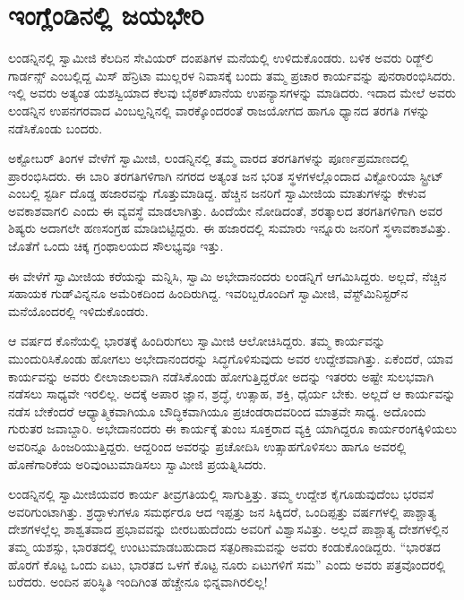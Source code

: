 
\chapter{ಇಂಗ್ಲೆಂಡಿನಲ್ಲಿ ಜಯಭೇರಿ}

\noindent

ಲಂಡನ್ನಿನಲ್ಲಿ ಸ್ವಾಮೀಜಿ ಕೆಲದಿನ ಸೇವಿಯರ್ ದಂಪತಿಗಳ ಮನೆಯಲ್ಲಿ ಉಳಿದುಕೊಂಡರು. ಬಳಿಕ ಅವರು ರಿಡ್ಜ್​ಲಿ ಗಾರ್ಡನ್ಸ್ ಎಂಬಲ್ಲಿದ್ದ ಮಿಸ್ ಹೆನ್ರಿಟಾ ಮುಲ್ಲರಳ ನಿವಾಸಕ್ಕೆ ಬಂದು ತಮ್ಮ ಪ್ರಚಾರ ಕಾರ್ಯವನ್ನು ಪುನರಾರಂಭಿಸಿದರು. ಇಲ್ಲಿ ಅವರು ಅತ್ಯಂತ ಯಶಸ್ವಿಯಾದ ಕೆಲವು ಬೈಠಕ್​ಖಾನೆಯ ಉಪನ್ಯಾಸಗಳನ್ನು ಮಾಡಿದರು. ಇದಾದ ಮೇಲೆ ಅವರು ಲಂಡನ್ನಿನ ಉಪನಗರವಾದ ವಿಂಬಲ್ಡನ್ನಿನಲ್ಲಿ ವಾರಕ್ಕೊಂದರಂತೆ ರಾಜಯೋಗದ ಹಾಗೂ ಧ್ಯಾನದ ತರಗತಿ ಗಳನ್ನು ನಡೆಸಿಕೊಂಡು ಬಂದರು.

ಅಕ್ಟೋಬರ್ ತಿಂಗಳ ವೇಳೆಗೆ ಸ್ವಾಮೀಜಿ, ಲಂಡನ್ನಿನಲ್ಲಿ ತಮ್ಮ ವಾರದ ತರಗತಿಗಳನ್ನು ಪೂರ್ಣಪ್ರಮಾಣದಲ್ಲಿ ಪ್ರಾರಂಭಿಸಿದರು. ಈ ಬಾರಿ ತರಗತಿಗಳಿಗಾಗಿ ನಗರದ ಅತ್ಯಂತ ಜನ ಭರಿತ ಸ್ಥಳಗಳಲ್ಲೊಂದಾದ ವಿಕ್ಟೋರಿಯಾ ಸ್ಟ್ರೀಟ್ ಎಂಬಲ್ಲಿ ಸ್ಟರ್ಡಿ ದೊಡ್ಡ ಹಜಾರವನ್ನು ಗೊತ್ತುಮಾಡಿದ್ದ. ಹೆಚ್ಚಿನ ಜನರಿಗೆ ಸ್ವಾಮೀಜಿಯ ಮಾತುಗಳನ್ನು ಕೇಳುವ ಅವಕಾಶವಾಗಲಿ ಎಂದು ಈ ವ್ಯವಸ್ಥೆ ಮಾಡಲಾಗಿತ್ತು. ಹಿಂದೆಯೇ ನೋಡಿದಂತೆ, ಶರತ್ಕಾಲದ ತರಗತಿಗಳಿಗಾಗಿ ಅವರ ಶಿಷ್ಯರು ಅದಾಗಲೇ ಹಣಸಂಗ್ರಹ ಮಾಡಿಬಿಟ್ಟಿದ್ದರು. ಈ ಹಜಾರದಲ್ಲಿ ಸುಮಾರು ಇನ್ನೂರು ಜನರಿಗೆ ಸ್ಥಳಾವಕಾಶವಿತ್ತು. ಜೊತೆಗೆ ಒಂದು ಚಿಕ್ಕ ಗ್ರಂಥಾಲಯದ ಸೌಲಭ್ಯವೂ ಇತ್ತು.

ಈ ವೇಳೆಗೆ ಸ್ವಾಮೀಜಿಯ ಕರೆಯನ್ನು ಮನ್ನಿಸಿ, ಸ್ವಾಮಿ ಅಭೇದಾನಂದರು ಲಂಡನ್ನಿಗೆ ಆಗಮಿಸಿದ್ದರು. ಅಲ್ಲದೆ, ನೆಚ್ಚಿನ ಸಹಾಯಕ ಗುಡ್​ವಿನ್ನನೂ ಅಮೆರಿಕದಿಂದ ಹಿಂದಿರುಗಿದ್ದ. ಇವರಿಬ್ಬರೊಂದಿಗೆ ಸ್ವಾಮೀಜಿ, ವೆಸ್ಟ್​ಮಿನಿಸ್ಟರ್​ನ ಮನೆಯೊಂದರಲ್ಲಿ ಇಳಿದುಕೊಂಡರು.

ಆ ವರ್ಷದ ಕೊನೆಯಲ್ಲಿ ಭಾರತಕ್ಕೆ ಹಿಂದಿರುಗಲು ಸ್ವಾಮೀಜಿ ಆಲೋಚಿಸಿದ್ದರು. ತಮ್ಮ ಕಾರ್ಯವನ್ನು ಮುಂದುರಿಸಿಕೊಂಡು ಹೋಗಲು ಅಭೇದಾನಂದರನ್ನು ಸಿದ್ಧಗೊಳಿಸುವುದು ಅವರ ಉದ್ದೇಶವಾಗಿತ್ತು. ಏಕೆಂದರೆ, ಯಾವ ಕಾರ್ಯವನ್ನು ಅವರು ಲೀಲಾಜಾಲವಾಗಿ ನಡೆಸಿಕೊಂಡು ಹೋಗುತ್ತಿದ್ದರೋ ಅದನ್ನು ಇತರರು ಅಷ್ಟೇ ಸುಲಭವಾಗಿ ನಡೆಸಲು ಸಾಧ್ಯವೇ ಇರಲಿಲ್ಲ. ಅದಕ್ಕೆ ಅಪಾರ ಜ್ಞಾನ, ಶ್ರದ್ಧೆ, ಉತ್ಸಾಹ, ಶಕ್ತಿ, ಧೈರ್ಯ ಬೇಕು. ಅಲ್ಲದೆ ಆ ಕಾರ್ಯವನ್ನು ನಡೆಸ ಬೇಕೆಂದರೆ ಆಧ್ಯಾತ್ಮಿಕವಾಗಿಯೂ ಬೌದ್ಧಿಕವಾಗಿಯೂ ಪ್ರಚಂಡರಾದವರಿಂದ ಮಾತ್ರವೇ ಸಾಧ್ಯ. ಅದೊಂದು ಗುರುತರ ಜವಾಬ್ದಾರಿ. ಅಭೇದಾನಂದರು ಈ ಕಾರ್ಯಕ್ಕೆ ತುಂಬ ಸೂಕ್ತರಾದ ವ್ಯಕ್ತಿ ಯಾಗಿದ್ದರೂ ಕಾರ್ಯರಂಗಕ್ಕಿಳಿಯಲು ಅವರಿನ್ನೂ ಹಿಂಜರಿಯುತ್ತಿದ್ದರು. ಆದ್ದರಿಂದ ಅವರನ್ನು ಪ್ರಚೋದಿಸಿ ಉತ್ಸಾಹಗೊಳಿಸಲು ಹಾಗೂ ಅವರಲ್ಲಿ ಹೊಣೆಗಾರಿಕೆಯ ಅರಿವುಂಟುಮಾಡಿಸಲು ಸ್ವಾಮೀಜಿ ಪ್ರಯತ್ನಿಸಿದರು.

ಲಂಡನ್ನಿನಲ್ಲಿ ಸ್ವಾಮೀಜಿಯವರ ಕಾರ್ಯ ತೀವ್ರಗತಿಯಲ್ಲಿ ಸಾಗುತ್ತಿತ್ತು. ತಮ್ಮ ಉದ್ದೇಶ ಕೈಗೂಡುವುದೆಂಬ ಭರವಸೆ ಅವರಿಗುಂಟಾಗಿತ್ತು. ಶ್ರದ್ಧಾಳುಗಳೂ ಸಮರ್ಥರೂ ಆದ ಇಪ್ಪತ್ತು ಜನ ಸಿಕ್ಕಿದರೆ, ಒಂದಿಪ್ಪತ್ತು ವರ್ಷಗಳಲ್ಲಿ ಪಾಶ್ಚಾತ್ಯ ದೇಶಗಳಲ್ಲೆಲ್ಲ ಶಾಶ್ವತವಾದ ಪ್ರಭಾವವನ್ನು ಬೀರಬಹುದೆಂದು ಅವರಿಗೆ ವಿಶ್ವಾಸವಿತ್ತು. ಅಲ್ಲದೆ ಪಾಶ್ಚಾತ್ಯ ದೇಶಗಳಲ್ಲಿನ ತಮ್ಮ ಯಶಸ್ಸು, ಭಾರತದಲ್ಲಿ ಉಂಟುಮಾಡಬಹುದಾದ ಸತ್ಪರಿಣಾಮವನ್ನು ಅವರು ಕಂಡುಕೊಂಡಿದ್ದರು. “ಭಾರತದ ಹೊರಗೆ ಕೊಟ್ಟ ಒಂದು ಏಟು, ಭಾರತದ ಒಳಗೆ ಕೊಟ್ಟ ನೂರು ಏಟುಗಳಿಗೆ ಸಮ” ಎಂದು ಅವರು ಪತ್ರವೊಂದರಲ್ಲಿ ಬರೆದರು. ಅಂದಿನ ಪರಿಸ್ಥಿತಿ ಇಂದಿಗಿಂತ ಹೆಚ್ಚೇನೂ ಭಿನ್ನವಾಗಿರಲಿಲ್ಲ!

